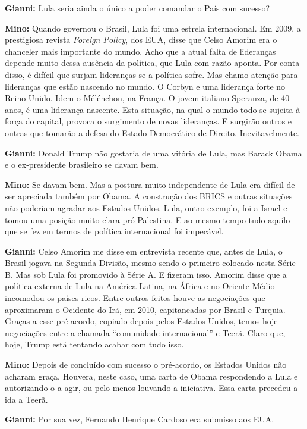 \textbf{Gianni:} Lula seria ainda o único a poder comandar o País com
sucesso?

\textbf{Mino:} Quando governou o Brasil, Lula foi uma estrela
internacional. Em 2009, a prestigiosa revista \emph{Foreign Policy}, dos
EUA, disse que Celso Amorim era o chanceler mais importante do mundo.
Acho que a atual falta de lideranças depende muito dessa ausência da
política, que Lula com razão aponta. Por conta disso, é difícil que
surjam lideranças se a política sofre. Mas chamo atenção para lideranças
que estão nascendo no mundo. O Corbyn e uma liderança forte no Reino
Unido. Idem o Mélénchon, na França. O jovem italiano Speranza, de 40
anos, é uma liderança nascente. Esta situação, na qual o mundo todo se
sujeita à força do capital, provoca o surgimento de novas lideranças. E
surgirão outros e outras que tomarão a defesa do Estado Democrático de
Direito. Inevitavelmente.

\textbf{Gianni:} Donald Trump não gostaria de uma vitória de Lula, mas
Barack Obama e o ex-presidente brasileiro se davam bem.

\textbf{Mino:} Se davam bem. Mas a postura muito independente de Lula
era difícil de ser apreciada também por Obama. A construção dos BRICS e
outras situações não poderiam agradar aos Estados Unidos. Lula, outro
exemplo, foi a Israel e tomou uma posição muito clara pró-Palestina. E
ao mesmo tempo tudo aquilo que se fez em termos de política
internacional foi impecável.

\textbf{Gianni:} Celso Amorim me disse em entrevista recente que, antes
de Lula, o Brasil jogava na Segunda Divisão, mesmo sendo o primeiro
colocado nesta Série B. Mas sob Lula foi promovido à Série A. E fizeram
isso. Amorim disse que a política externa de Lula na América Latina, na
África e no Oriente Médio incomodou os países ricos. Entre outros feitos
houve as negociações que aproximaram o Ocidente do Irã, em 2010,
capitaneadas por Brasil e Turquia. Graças a esse pré-acordo, copiado
depois pelos Estados Unidos, temos hoje negociações entre a chamada
``comunidade internacional'' e Teerã. Claro que, hoje, Trump está
tentando acabar com tudo isso.

\textbf{Mino:} Depois de concluído com sucesso o pré-acordo, os Estados
Unidos não acharam graça. Houvera, neste caso, uma carta de Obama
respondendo a Lula e autorizando-o a agir, ou pelo menos louvando a
iniciativa. Essa carta precedeu a ida a Teerã.

\textbf{Gianni:} Por sua vez, Fernando Henrique Cardoso era submisso aos
EUA.

